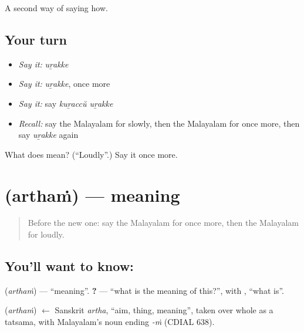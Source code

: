 \begin{grammarlens}[title={What you've built}]
A second way of saying how.
\end{grammarlens}

\subsection*{Your turn}
\begin{itemize}
\raggedright
  \item \emph{Say it:} \emph{uṟakke}
  \item \emph{Say it:} \emph{uṟakke}, once more
  \item \emph{Say it:} say \emph{kuṟaccŭ uṟakke}
  \item \emph{Recall:} say the Malayalam for slowly, then the Malayalam for once more, then say \emph{uṟakke} again
\end{itemize}

\begin{tcolorbox}[breakable,colback=teal!4,colframe=teal!35!black,title={Before you move on}]
What does  mean? (\textquotedblleft{}Loudly\textquotedblright{}.) Say it once more.
\end{tcolorbox}
\section[\texorpdfstring{\ml{അർത്ഥം} (arthaṁ)}{അർത്ഥം (arthaṁ)}]{ (arthaṁ) — meaning}

\label{lesson:ML-C119-meaning}



\begin{quote}
Before the new one: say the Malayalam for once more, then the Malayalam for loudly.
\end{quote}

\subsection*{You'll want to know: }
\textbf{} (\emph{arthaṁ}) — \textquotedblleft{}meaning\textquotedblright{}. \textbf{  ?} — \textquotedblleft{}what is the meaning of this?\textquotedblright{}, with \textbf{}, \textquotedblleft{}what is\textquotedblright{}.

\begin{cousinweb}
\textbf{} (\emph{arthaṁ}) $\leftarrow$ Sanskrit \emph{artha}, \textquotedblleft{}aim, thing, meaning\textquotedblright{}, taken over whole as a tatsama, with Malayalam's noun ending \emph{-ṁ} (CDIAL 638).
\end{cousinweb}

